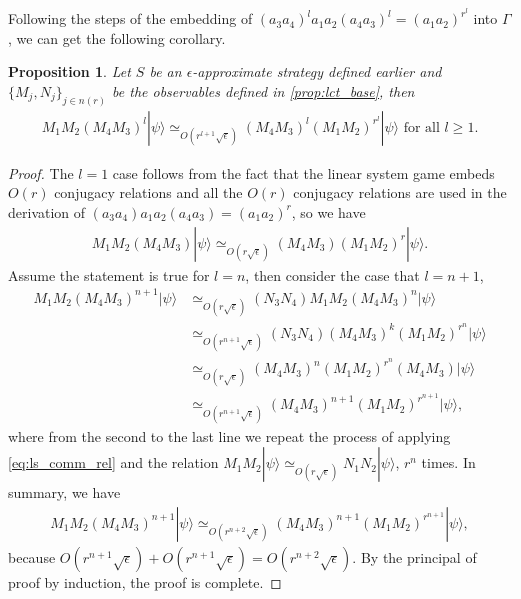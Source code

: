 \documentclass[11pt,letterpaper]{article}
\newcommand{\ket}[1]{|#1\rangle}
\newcommand{\1}{\mathbb{1}}
\newcommand{\nr}{n(r)}
\newcommand{\ep}{\epsilon}
\newcommand{\se}{\sqrt{\epsilon}}
\newcommand{\appd}[1]{\simeq_{#1}}
\newtheorem{proposition}[theorem]{Proposition}
\theoremstyle{definition}
\begin{document}
Following the steps of the embedding of $(a_3a_4)^l a_1a_2(a_4a_3)^l = (a_1a_2)^{r^l}$ into $\Gamma$,
we can get the following corollary.
\begin{proposition}
\label{prop:lct_adv}
Let $S$ be an $\ep$-approximate strategy defined earlier and $\{M_j, N_j\}_{j \in \nr}$ be the observables defined in 
\cref{prop:lct_base}, 
then
\begin{align}
	M_1M_2 (M_4M_3)^l \ket{\psi}\appd{O(r^{l+1} \se)} (M_4M_3)^l (M_1M_2)^{r^l} \ket{\psi} \text{ for all } l \geq 1.
\end{align}
\end{proposition}
\begin{proof}
The $l = 1$ case follows from the fact that the linear system game embeds $O(r)$ conjugacy relations and 
all the $O(r)$ conjugacy relations are used in the derivation of $(a_3a_4)a_1a_2(a_4a_3) = (a_1a_2)^r$, so we 
have
\begin{align}
	\label{eq:ls_comm_rel}
	M_1M_2 (M_4M_3) \ket{\psi} \appd{O(r\se)} (M_4M_3)(M_1M_2)^r \ket{\psi}.
\end{align}
Assume the statement is true for $l = n$, then consider the case that $l = n+1$,
\begin{align*}
	M_1M_2 (M_4M_3)^{n+1} \ket{\psi}  &\appd{O(r\se)} (N_3N_4) M_1M_2(M_4M_3)^n \ket{\psi} \\
	&\appd{O(r^{n+1}\se)} (N_3N_4) (M_4M_3)^k (M_1M_2)^{r^n} \ket{\psi}\\
	&\appd{O(r\se)} (M_4M_3)^n (M_1M_2)^{r^n} (M_4M_3) \ket{\psi} \\
	& \appd{O(r^{n+1} \se)} (M_4M_3)^{n+1} (M_1M_2)^{r^{n+1}} \ket{\psi},
\end{align*}
where from the second to the last line we repeat the process of applying \cref{eq:ls_comm_rel} 
and the relation $M_1M_2 \ket{\psi} \appd{O(r\se)} N_1N_2 \ket{\psi}$, $r^n$ times.
In summary, we have 
\begin{align}
	M_1M_2(M_4M_3)^{n+1} \ket{\psi} \appd{O(r^{n+2} \se)} (M_4M_3)^{n+1} (M_1M_2)^{r^{n+1}}\ket{\psi},
\end{align}
because $O(r^{n+1} \se)+O(r^{n+1}\se) = O(r^{n+2} \se)$.
By the principal of proof by induction, the proof is complete.
\end{proof}
\end{document}
